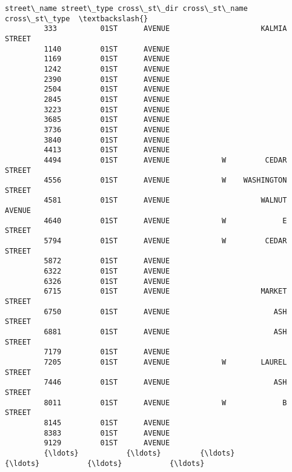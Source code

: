 \documentclass[11pt]{article}
\begin{document}
\begin{Verbatim}[commandchars=\\\{\}]
               street\_name street\_type cross\_st\_dir cross\_st\_name cross\_st\_type  \textbackslash{}
         333          01ST      AVENUE                     KALMIA        STREET   
         1140         01ST      AVENUE                                            
         1169         01ST      AVENUE                                            
         1242         01ST      AVENUE                                            
         2390         01ST      AVENUE                                            
         2504         01ST      AVENUE                                            
         2845         01ST      AVENUE                                            
         3223         01ST      AVENUE                                            
         3685         01ST      AVENUE                                            
         3736         01ST      AVENUE                                            
         3840         01ST      AVENUE                                            
         4413         01ST      AVENUE                                            
         4494         01ST      AVENUE            W         CEDAR        STREET   
         4556         01ST      AVENUE            W    WASHINGTON        STREET   
         4581         01ST      AVENUE                     WALNUT        AVENUE   
         4640         01ST      AVENUE            W             E        STREET   
         5794         01ST      AVENUE            W         CEDAR        STREET   
         5872         01ST      AVENUE                                            
         6322         01ST      AVENUE                                            
         6326         01ST      AVENUE                                            
         6715         01ST      AVENUE                     MARKET        STREET   
         6750         01ST      AVENUE                        ASH        STREET   
         6881         01ST      AVENUE                        ASH        STREET   
         7179         01ST      AVENUE                                            
         7205         01ST      AVENUE            W        LAUREL        STREET   
         7446         01ST      AVENUE                        ASH        STREET   
         8011         01ST      AVENUE            W             B        STREET   
         8145         01ST      AVENUE                                            
         8383         01ST      AVENUE                                            
         9129         01ST      AVENUE                                            
         {\ldots}           {\ldots}         {\ldots}          {\ldots}           {\ldots}           {\ldots}   

\end{Verbatim}
\end{document}
